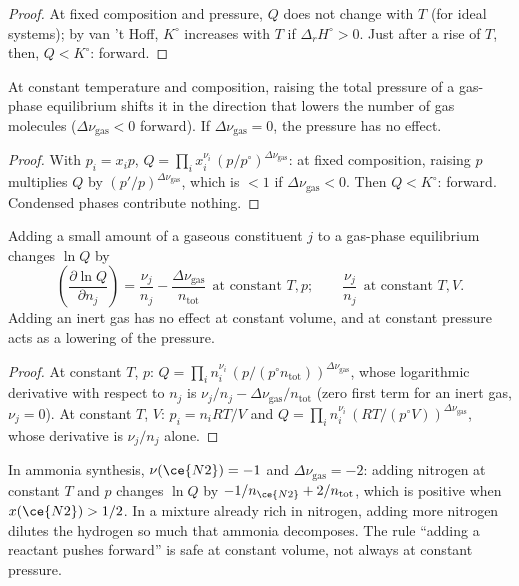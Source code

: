\begin{proof}
At fixed composition and pressure, $Q$ does not change with $T$ (for ideal
systems); by van 't Hoff, $K^\circ$ increases with $T$ if $\Delta_r H^\circ >
0$. Just after a rise of $T$, then, $Q < K^\circ$: forward.
\end{proof}

\begin{proposition}[Pressure]\label{prop:b2:equilibrium-shifts:pressure}
At constant temperature and composition, raising the total pressure of a
gas-phase equilibrium shifts it in the direction that lowers the number of
gas molecules ($\Delta\nu_{\text{gas}} < 0$ forward). If $\Delta\nu_{\text{gas}}
= 0$, the pressure has no effect.
\end{proposition}

\begin{proof}
With $p_i = x_ip$, $Q = \prod_i x_i^{\nu_i}\,(p/p^\circ)^{\Delta\nu_{\text{gas}}}$:
at fixed composition, raising $p$ multiplies $Q$ by
$(p'/p)^{\Delta\nu_{\text{gas}}}$, which is $< 1$ if $\Delta\nu_{\text{gas}} <
0$. Then $Q < K^\circ$: forward. Condensed phases contribute nothing.
\end{proof}

\begin{proposition}\label{prop:b2:equilibrium-shifts:adding}
Adding a small amount of a gaseous constituent $j$ to a gas-phase equilibrium
changes $\ln Q$ by
\[
  \left(\frac{\partial\ln Q}{\partial n_j}\right) = \frac{\nu_j}{n_j} -
  \frac{\Delta\nu_{\text{gas}}}{n_{\text{tot}}}\ \ \text{at constant } T, p ;
  \qquad \frac{\nu_j}{n_j}\ \ \text{at constant } T, V .
\]
Adding an inert gas has no effect at constant volume, and at constant pressure
acts as a lowering of the pressure.
\end{proposition}

\begin{proof}
At constant $T$, $p$: $Q = \prod_i n_i^{\nu_i}\,(p/(p^\circ n_{\text{tot}}))^{
\Delta\nu_{\text{gas}}}$, whose logarithmic derivative with respect to $n_j$ is
$\nu_j/n_j - \Delta\nu_{\text{gas}}/n_{\text{tot}}$ (zero first term for an inert
gas, $\nu_j = 0$). At constant $T$, $V$: $p_i = n_iRT/V$ and $Q = \prod_i n_i^{
\nu_i}\,(RT/(p^\circ V))^{\Delta\nu_{\text{gas}}}$, whose derivative is
$\nu_j/n_j$ alone.
\end{proof}

\begin{remark}\label{rem:b2:equilibrium-shifts:paradox}
In ammonia synthesis, $\nu(\ce{N2}) = -1$ and $\Delta\nu_{\text{gas}} = -2$:
adding nitrogen at constant $T$ and $p$ changes $\ln Q$ by $-1/n_{\ce{N2}} +
2/n_{\text{tot}}$, which is positive when $x(\ce{N2}) > 1/2$. In a mixture
already rich in nitrogen, adding more nitrogen dilutes the hydrogen so much
that ammonia decomposes. The rule ``adding a reactant pushes forward'' is safe
at constant volume, not always at constant pressure.
\end{remark}

